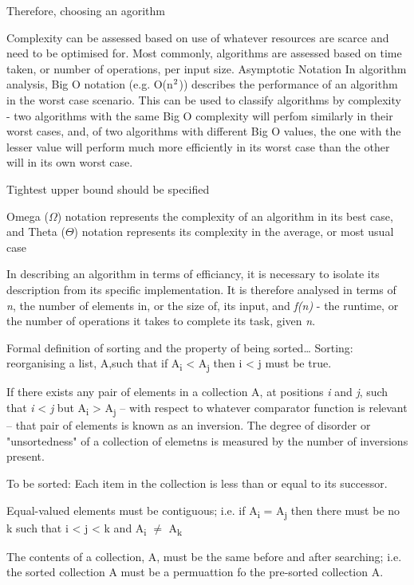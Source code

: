 \documentclass[12pt, a4paper]{article}
\begin{document}
Therefore, choosing an agorithm 

Complexity can be assessed based on use of whatever resources are scarce and need to be optimised for. Most commonly, algorithms are assessed based on time taken, or number of operations, per input size. 
Asymptotic Notation
In algorithm analysis, Big O notation (e.g. O(n$\textsuperscript{2}$)) describes the performance of an algorithm in the worst case scenario. This can be used to classify algorithms by complexity - two algorithms with the same Big O complexity will perfom similarly in their worst cases, and, of two algorithms with different Big O values, the one with the lesser value will perform much more efficiently in its worst case than the other will in its own worst case.

Tightest upper bound should be specified

Omega ($\Omega$) notation represents the complexity of an algorithm in its best case, and Theta ($\Theta$) notation represents its complexity in the average, or most usual case

In describing an algorithm in terms of efficiancy, it is necessary to isolate its description from its specific implementation. It is therefore analysed in terms of \emph{n}, the number of elements in, or the size of, its input, and \emph{f(n)} - the runtime, or the number of operations it takes to complete its task, given \emph{n}.

Formal definition of sorting and the property of being sorted\dots
Sorting: reorganising a list, A,such that if A\textsubscript{i} < A\textsubscript{j} then i < j must be true.


If there exists any pair of elements in a collection A, at positions \emph{i} and \emph{j}, such that \emph{i} < \emph{j} but A\textsubscript{i} > A\textsubscript{j} -- with respect to whatever comparator function is relevant -- that pair of elements is known as an inversion. The degree of disorder or "unsortedness" of a collection of elemetns is measured by the number of inversions present.

To be sorted: Each item in the collection is less than or equal to its successor.

Equal-valued elements must be contiguous; i.e. if A\textsubscript{i} = A\textsubscript{j} then there must be no k such that i < j < k and A\textsubscript{i} $\ne$ A\textsubscript{k}

The contents of a collection, A, must be the same before and after searching; i.e. the sorted collection A must be a permuattion fo the pre-sorted collection A.
\end{document}
